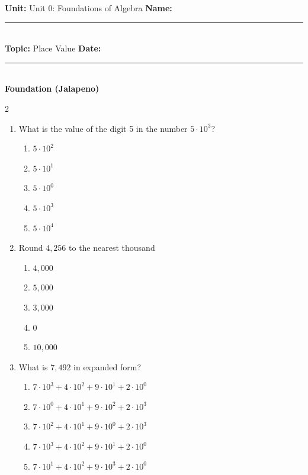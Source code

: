 \documentclass[10pt]{article}
\begin{document}
\enlargethispage{2.5cm}

\begin{tcolorbox}[colback=mainblue!5, colframe=mainblue, sharp corners, boxrule=0.5pt]
    \small \textbf{Unit:} Unit 0: Foundations of Algebra \hfill \textbf{Name:} \rule{3cm}{0.4pt} \\
    \small \textbf{Topic:} Place Value \hfill \textbf{Date:} \rule{2cm}{0.4pt} \\
    \centering \textbf{\large Foundation (Jalapeno)}
\end{tcolorbox}

\vspace{0.2cm}

\begin{multicols}{2}
\begin{enumerate}[label=\textbf{Q\arabic*.}, leftmargin=*, itemsep=6pt, parsep=0pt]

  \item \small What is the value of the digit 5 in the number $5\cdot10^3$?
  \begin{enumerate}[label=(\Alph*), leftmargin=0.6cm, nosep, itemsep=2pt]
    \item $5\cdot10^2$
    \item $5\cdot10^1$
    \item $5\cdot10^0$
    \item $5\cdot10^3$
    \item $5\cdot10^4$
  \end{enumerate}

  \item \small Round $4,256$ to the nearest thousand
  \begin{enumerate}[label=(\Alph*), leftmargin=0.6cm, nosep, itemsep=2pt]
    \item $4,000$
    \item $5,000$
    \item $3,000$
    \item $0$
    \item $10,000$
  \end{enumerate}

  \item \small What is $7,492$ in expanded form?
  \begin{enumerate}[label=(\Alph*), leftmargin=0.6cm, nosep, itemsep=2pt]
    \item $7\cdot10^3+4\cdot10^2+9\cdot10^1+2\cdot10^0$
    \item $7\cdot10^0+4\cdot10^1+9\cdot10^2+2\cdot10^3$
    \item $7\cdot10^2+4\cdot10^1+9\cdot10^0+2\cdot10^3$
    \item $7\cdot10^3+4\cdot10^2+9\cdot10^1+2\cdot10^0$
    \item $7\cdot10^1+4\cdot10^2+9\cdot10^3+2\cdot10^0$
  \end{enumerate}


\end{enumerate}
\end{multicols}
\end{document}
